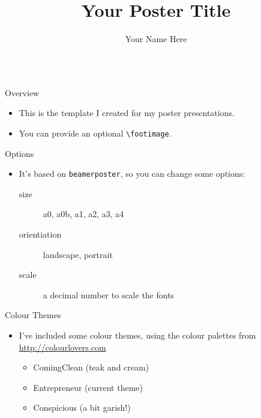 \documentclass{beamer}
\author{Your Name Here}
\title{Your Poster Title}
\begin{document}
\begin{frame}[fragile]
\begin{columns}[T]

\begin{column}{.33\textwidth}

\begin{block}{Overview}
\begin{itemize}
\item This is the template I created for my poster presentations.
\item You can provide an optional \verb|\footimage|.
\end{itemize}
\end{block}

\begin{block}{Options}
\begin{itemize}
\item It's based on \texttt{beamerposter}, so you can change some options:
  \begin{description}
  \item[size] a0, a0b, a1, a2, a3, a4
  \item[orientiation] landscape, portrait
  \item[scale] a decimal number to scale the fonts
  \end{description}
\end{itemize}
\end{block}

\begin{block}{Colour Themes}
\begin{itemize}
\item I've included some colour themes, using the colour palettes from \url{http://colourlovers.com}
\begin{itemize}
\item ComingClean (teak and cream)
\item Entrepreneur (current theme)
\item Conspicious (a bit garish!)
\end{itemize}
\end{itemize}
\end{block}

\end{column}

\begin{column}{.3\textwidth}


\end{column}
\end{columns}
\end{frame}
\end{document}
